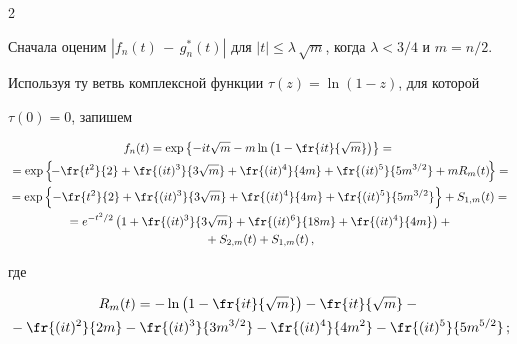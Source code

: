 \begin{multicols}{2}
\medskip








Сначала оценим   $|f_n(t)\,-\,g^*_n(t)|$ для $|t| \le \lambda\,\sqrt{m}$, когда    $\lambda < 3/4$ и $m=n/2$.


Используя ту ветвь комплексной функции    $\tau(z)=\ln(1 - z)$, для которой


  $\tau(0) =0$, запишем


\begin{multline}


f_n(t)  =  \exp\left\{-it\sqrt{m}-m\ln\left(1-\fr{it}{\sqrt{m}}\right)\right\}={}\\


{}= \exp\left\{\!


-\fr{t^2}{2} +\fr{(it)^3}{3\sqrt{m}}+\fr{(it)^4}{4m}+ %




\fr{(it)^5}{5m^{3/2}}+mR_m(t)\!\right\}={}\hspace{-1.603pt}\\


{} = \exp\left\{-\fr{t^2}{2} +\fr{(it)^3}{3\sqrt{m}}+\fr{(it)^4}{4m}+


\fr{(it)^5}{5m^{3/2}}\right\}+S_{1,m}(t)={}\\


{} =  e^{-t^2/2}\left(1+\fr{(it)^3}{3\sqrt{m}}+\fr{(it)^6}{18m}+\fr{(it)^4}{4m} \right)+{}\\


{} +S_{2,m}(t)+S_{1,m}(t)\,,


\label{g7}


\end{multline}


где


\begin{multline*}


 R_m(t) =  -\ln\left(1-\fr{ it}{\sqrt{m}}\right) -\fr{ it}{ \sqrt{m}}-{}\\


 {}-\fr{(it)^2}{ 2m} -


\fr{ (it)^3}{ 3m^{3/2}}-\fr{ (it)^4}{ 4m^{2}}-\fr{ (it)^5}{ 5m^{5/2}}\,;


\end{multline*}





\vspace*{-12pt}






\end{multicols}
